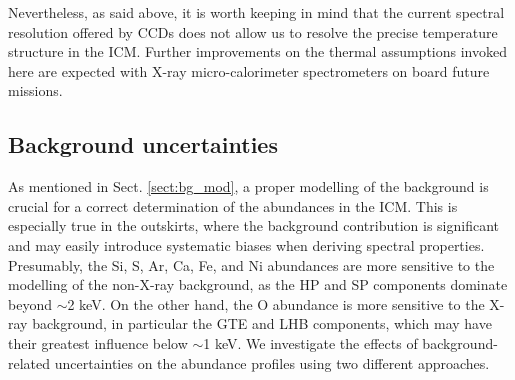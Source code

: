 \documentclass{aa}
\begin{document}
Nevertheless, as said above, it is worth keeping in mind that the current spectral resolution offered by CCDs does not allow us to resolve the precise temperature structure in the ICM. Further improvements on the thermal assumptions invoked here are expected with X-ray micro-calorimeter spectrometers on board future missions.







\subsection{Background uncertainties}\label{sect:systematics_bg}

As mentioned in Sect. \ref{sect:bg_mod}, a proper modelling of the background is crucial for a correct determination of the abundances in the ICM. This is especially true in the outskirts, where the background contribution is significant and may easily introduce systematic biases when deriving spectral properties. Presumably, the Si, S, Ar, Ca, Fe, and Ni abundances are more sensitive to the modelling of the non-X-ray background, as the HP and SP components dominate beyond $\sim$2 keV. On the other hand, the O abundance is more sensitive to the X-ray background, in particular the GTE and LHB components, which may have their greatest influence below $\sim$1 keV. We investigate the effects of background-related uncertainties on the abundance profiles using two different approaches.
\end{document}
